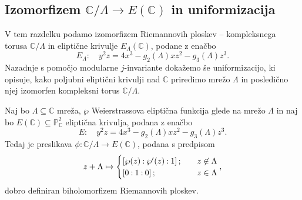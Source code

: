 \documentclass[mat1]{fmfdelo}
\numberwithin{equation}{section}
\newcommand{\C}{\mathbb C}
\newcommand{\Lattice}{\mathscr{L}}
\newcommand{\CM}{\mathbb C ^*}
\newcommand{\PC}{\mathbb{P}^2_\C}
\newcommand{\oio}{\pcoor{0: 1 : 0}}
\newcommand{\om}{\omega}
\newcommand{\inv}{^{-1}}
\newcommand{\torus}{\C/\Lambda}
\newcommand{\htp}{\simeq}
\newcommand{\pcoor}[1]{%
\begingroup\lccode`~=`: \lowercase{\endgroup
\edef~}{\mathbin{\mathchar\the\mathcode`:}\nobreak}%
\left[%
\begingroup
\mathcode`:=\string"8000
#1%
\endgroup
\right]%
}
\renewcommand\Im{\operatorname{Im}}%
\theoremstyle{definition}
\begin{document}



\subsection{Izomorfizem \texorpdfstring{$\C/\Lambda \to E(\C)$ in uniformizacija}{}} 

V tem razdelku podamo izomorfizem Riemannovih ploskev -- kompleksnega torusa $\torus$ in eliptične krivulje $E_\Lambda(\C)$, podane z enačbo
\[
    E_\Lambda: \quad y^2z = 4x^3 - g_2(\Lambda)xz^2 - g_3(\Lambda)z^3.
\]
Nazadnje s pomočjo modularne $j$-invariante dokažemo še uniformizacijo, ki opisuje, kako poljubni eliptični krivulji nad $\C$ priredimo mrežo $\Lambda$ in posledično njej izomorfen kompleksni torus $\torus$.

\begin{izrek}
    \label{izomorfizem torusa in krivulje}
    Naj bo $\Lambda \subseteq \C$ mreža, $\wp$ Weierstrassova eliptična funkcija glede na mrežo $\Lambda$ in naj bo $E(\C)\subseteq \PC$ eliptična krivulja, podana z enačbo
    \[
        E: \quad y^2z = 4x^3 - g_2(\Lambda)xz^2 - g_3(\Lambda)z^3.  
    \]
    Tedaj je preslikava $\phi : \torus \to E(\C)$, podana s predpisom
    \[
        z + \Lambda \mapsto 
        \begin{cases}
            \pcoor{\wp(z) : \wp'(z) : 1}; \quad &z \not\in \Lambda \\
            \oio; \quad &z \in \Lambda
        \end{cases},
    \]
    dobro definiran biholomorfizem Riemannovih ploskev.
\end{izrek}
\end{document}
